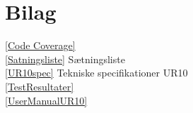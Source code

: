 \chapter{Bilag}\label{Bilag}
\ref{Code Coverage}	\\					
\ref{Satningsliste} Sætningsliste \\
\ref{UR10spec} Tekniske specifikationer UR10  \\
\ref{TestResultater}\\
\ref{UserManualUR10}
